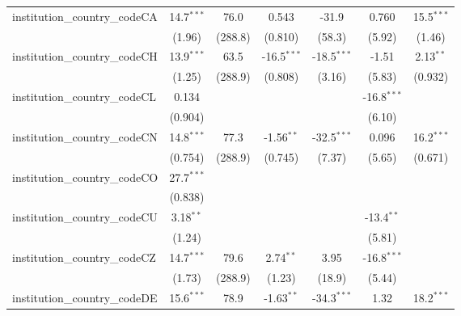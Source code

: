 \begin{tabular}{lcccccc}
   institution\_country\_codeCA          & 14.7$^{***}$  & 76.0         & 0.543         & -31.9         & 0.760         & 15.5$^{***}$\\   
                                         & (1.96)        & (288.8)      & (0.810)       & (58.3)        & (5.92)        & (1.46)\\   
   institution\_country\_codeCH          & 13.9$^{***}$  & 63.5         & -16.5$^{***}$ & -18.5$^{***}$ & -1.51         & 2.13$^{**}$\\   
                                         & (1.25)        & (288.9)      & (0.808)       & (3.16)        & (5.83)        & (0.932)\\   
   institution\_country\_codeCL          & 0.134         &              &               &               & -16.8$^{***}$ &   \\   
                                         & (0.904)       &              &               &               & (6.10)        &   \\   
   institution\_country\_codeCN          & 14.8$^{***}$  & 77.3         & -1.56$^{**}$  & -32.5$^{***}$ & 0.096         & 16.2$^{***}$\\   
                                         & (0.754)       & (288.9)      & (0.745)       & (7.37)        & (5.65)        & (0.671)\\   
   institution\_country\_codeCO          & 27.7$^{***}$  &              &               &               &               &   \\   
                                         & (0.838)       &              &               &               &               &   \\   
   institution\_country\_codeCU          & 3.18$^{**}$   &              &               &               & -13.4$^{**}$  &   \\   
                                         & (1.24)        &              &               &               & (5.81)        &   \\   
   institution\_country\_codeCZ          & 14.7$^{***}$  & 79.6         & 2.74$^{**}$   & 3.95          & -16.8$^{***}$ &   \\   
                                         & (1.73)        & (288.9)      & (1.23)        & (18.9)        & (5.44)        &   \\   
   institution\_country\_codeDE          & 15.6$^{***}$  & 78.9         & -1.63$^{**}$  & -34.3$^{***}$ & 1.32          & 18.2$^{***}$\\   

\end{tabular}
